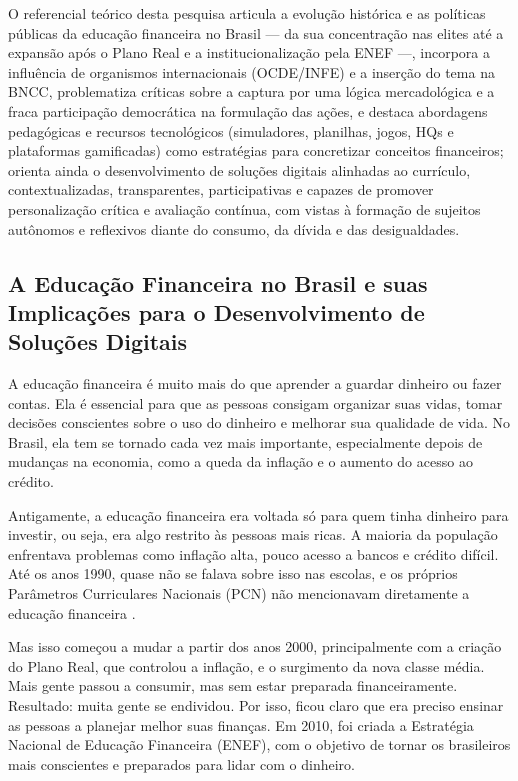 \documentclass[
	article,			%
	12pt,				%
	oneside,			%
	a4paper,			%
	english,			%
	brazil,				%
	sumario=tradicional
	]{abntex2}
\begin{document}
O referencial teórico desta pesquisa articula a evolução histórica e as políticas públicas da educação financeira no Brasil — da sua concentração nas elites até a expansão após o Plano Real e a institucionalização pela ENEF —, incorpora a influência de organismos internacionais (OCDE/INFE) e a inserção do tema na BNCC, problematiza críticas sobre a captura por uma lógica mercadológica e a fraca participação democrática na formulação das ações, e destaca abordagens pedagógicas e recursos tecnológicos (simuladores, planilhas, jogos, HQs e plataformas gamificadas) como estratégias para concretizar conceitos financeiros; orienta ainda o desenvolvimento de soluções digitais alinhadas ao currículo, contextualizadas, transparentes, participativas e capazes de promover personalização crítica e avaliação contínua, com vistas à formação de sujeitos autônomos e reflexivos diante do consumo, da dívida e das desigualdades.

\subsection{A Educação Financeira no Brasil e suas Implicações para o Desenvolvimento de Soluções Digitais}
    A educação financeira é muito mais do que aprender a guardar dinheiro ou fazer contas. Ela é essencial para que as pessoas consigam organizar suas vidas, tomar decisões conscientes sobre o uso do dinheiro e melhorar sua qualidade de vida. No Brasil, ela tem se tornado cada vez mais importante, especialmente depois de mudanças na economia, como a queda da inflação e o aumento do acesso ao crédito.

Antigamente, a educação financeira era voltada só para quem tinha dinheiro para investir, ou seja, era algo restrito às pessoas mais ricas. A maioria da população enfrentava problemas como inflação alta, pouco acesso a bancos e crédito difícil. Até os anos 1990, quase não se falava sobre isso nas escolas, e os próprios Parâmetros Curriculares Nacionais (PCN) não mencionavam diretamente a educação financeira  .

Mas isso começou a mudar a partir dos anos 2000, principalmente com a criação do Plano Real, que controlou a inflação, e o surgimento da nova classe média. Mais gente passou a consumir, mas sem estar preparada financeiramente. Resultado: muita gente se endividou. Por isso, ficou claro que era preciso ensinar as pessoas a planejar melhor suas finanças. Em 2010, foi criada a Estratégia Nacional de Educação Financeira (ENEF), com o objetivo de tornar os brasileiros mais conscientes e preparados para lidar com o dinheiro.
\end{document}
